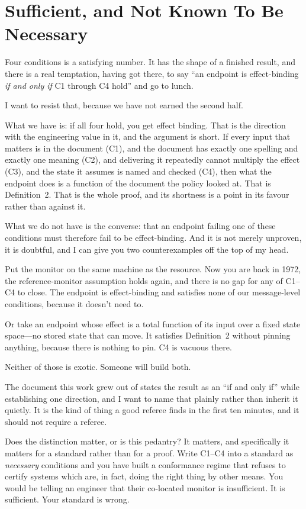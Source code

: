 \documentclass[11pt]{article}
\begin{document}
\section{Sufficient, and Not Known To Be Necessary}
\label{sec:sufficiency}

Four conditions is a satisfying number. It has the shape of a finished result,
and there is a real temptation, having got there, to say ``an endpoint is
effect-binding \emph{if and only if} C1 through C4 hold'' and go to lunch.

I want to resist that, because we have not earned the second half.

What we have is: if all four hold, you get effect binding. That is the
direction with the engineering value in it, and the argument is short. If
every input that matters is in the document (C1), and the document has exactly
one spelling and exactly one meaning (C2), and delivering it repeatedly cannot
multiply the effect (C3), and the state it assumes is named and checked (C4),
then what the endpoint does is a function of the document the policy looked
at. That is Definition~2. That is the whole proof, and its shortness is a
point in its favour rather than against it.

What we do not have is the converse: that an endpoint failing one of these
conditions must therefore fail to be effect-binding. And it is not merely
unproven, it is doubtful, and I can give you two counterexamples off the top
of my head.

Put the monitor on the same machine as the resource. Now you are back in 1972,
the reference-monitor assumption holds again, and there is no gap for any of
C1--C4 to close. The endpoint is effect-binding and satisfies none of our
message-level conditions, because it doesn't need to.

Or take an endpoint whose effect is a total function of its input over a fixed
state space---no stored state that can move. It satisfies Definition~2 without
pinning anything, because there is nothing to pin. C4 is vacuous there.

Neither of those is exotic. Someone will build both.

The document this work grew out of states the result as an ``if and only if''
while establishing one direction, and I want to name that plainly rather than
inherit it quietly. It is the kind of thing a good referee finds in the first
ten minutes, and it should not require a referee.

Does the distinction matter, or is this pedantry? It matters, and specifically
it matters for a standard rather than for a proof. Write C1--C4 into a
standard as \emph{necessary} conditions and you have built a conformance
regime that refuses to certify systems which are, in fact, doing the right
thing by other means. You would be telling an engineer that their co-located
monitor is insufficient. It is sufficient. Your standard is wrong.
\end{document}
